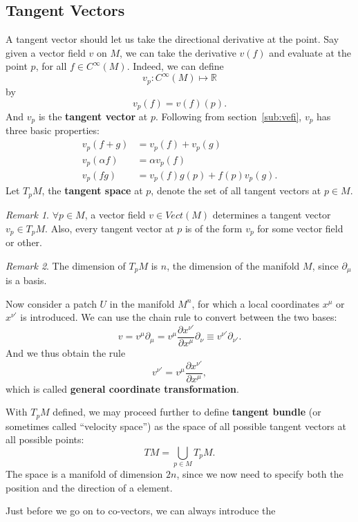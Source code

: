 \documentclass[a4paper,11pt]{article}
\theoremstyle{remark}
\newtheorem{remark}{Remark}[section]
\begin{document}
\subsection{Tangent Vectors}
\label{sub:TV}
A tangent vector should let us take the directional derivative at the
point. Say given a vector field $v$ on $M$, we can take the derivative
$v(f)$ and evaluate at the point $p$, for all $f \in
C^{\infty}(M)$. Indeed, we can define $$v_p: C^{\infty}(M)\mapsto
\mathbb{R}$$ by $$v_p(f)=v(f)(p).$$ And $v_p$ is the \textbf{tangent
  vector} at $p$. Following from section~\ref{sub:vefi}, $v_p$ has
three basic properties:
\begin{align*}
  v_p (f+g) &= v_p(f) + v_p(g) \\
  v_p(\alpha f) &= \alpha v_p(f) \\
  v_p(f g) &= v_p(f)g(p) + f(p)v_p(g).
\end{align*}
Let $T_pM$, the \textbf{tangent space} at $p$, denote the set of all
tangent vectors at $p\in M$. \par
\begin{remark}
  $\forall p\in M$, a vector field $v\in Vect(M)$ determines a tangent
  vector $v_p\in T_pM$. Also, every tangent vector at $p$ is of the
  form $v_p$ for some vector field or other.\par
\end{remark}
\begin{remark}
  The dimension of $T_pM$ is $n$, the dimension of the manifold $M$,
  since ${\partial_{\mu}}$ is a basis. \par
\end{remark}
Now consider a patch $U$ in the manifold $M^n$, for which a local
coordinates $x^{\mu}$ or $x^{\nu '}$ is introduced. We can use the
chain rule to convert between the two bases:$$v =
v^{\mu}\partial_{\mu} = v^{\mu}\frac{\partial x^{\nu '}}{\partial
  x^{\mu}}\partial_{\nu}\equiv v^{\nu '}\partial_{\nu '}.$$ And we
thus obtain the rule$$v^{\nu '} = v^{\mu}\frac{\partial x^{\nu
    '}}{\partial x^{\mu}},$$ which is called \textbf{general
  coordinate transformation}.\par
With $T_pM$ defined, we may proceed further to define \textbf{tangent
  bundle} (or sometimes called ``velocity space'') as the space of all
possible tangent vectors at all possible points:$$TM = \bigcup_{p\in
  M}T_pM.$$ The space is a manifold of dimension $2n$, since we now
need to specify both the position and the direction of a element.\par
Just before we go on to co-vectors, we can always introduce the
\end{document}
